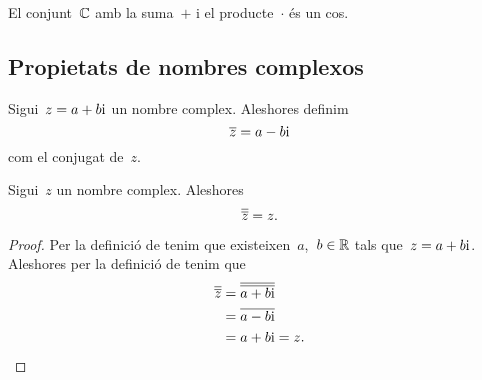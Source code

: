 \documentclass[../../main.tex]{subfiles}
\begin{document}
    \begin{corollary}
        \label{cor:els complexos formen un cos}
        El conjunt~\(\mathbb{C}\) amb la suma~\(+\)
        i el producte~\(\cdot\) és un cos.
    \end{corollary}
    \subsection{Propietats de nombres complexos}
    \begin{definition}
        \label{def:conjugat d'un nombre complex}
        Sigui~\(z = a+b\mathrm{i}\) un nombre complex.
        Aleshores definim
        \[
            \overline{z} = a-b\mathrm{i}
        \]
        com el conjugat de~\(z\).
    \end{definition}
    \begin{proposition}
        \label{prop:el conjugat del conjugat d'un nombre complex és ell mateix}
        Sigui~\(z\) un nombre complex.
        Aleshores
        \[
            \overline{\overline{z}} = z.
        \]
        \begin{proof}
            Per la definició de  tenim que
            existeixen~\(a\),~\(b\in\mathbb{R}\) tals que~\(z = a+b\mathrm{i}\).
            Aleshores per la definició
            de  tenim que
            \begin{align*}
                \overline{\overline{z}} &= \overline{\overline{a+b\mathrm{i}}} \\
                                        &= \overline{a-b\mathrm{i}} \\
                                        &= a+b\mathrm{i} = z.\qedhere
            \end{align*}
        \end{proof}
    \end{proposition}
\end{document}
